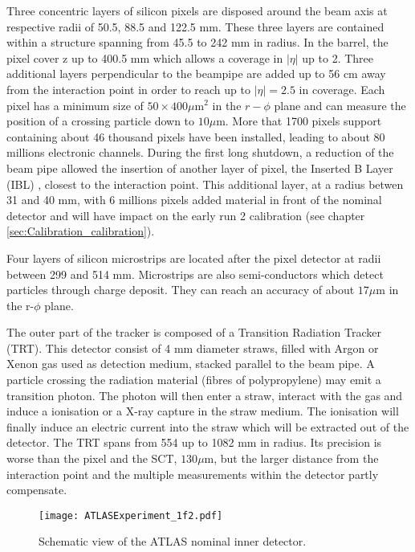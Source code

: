 Three concentric layers of silicon pixels are disposed around the beam axis at respective radii of 50.5, 88.5 and 122.5 mm.
These three layers are contained within a structure spanning from 45.5 to 242 mm in radius.
In the barrel, the pixel cover z up to 400.5 mm which allows a coverage in $|\eta|$ up to 2.
Three additional layers perpendicular to the beampipe are added up to 56 cm away from the interaction point in order to reach up to $|\eta|=2.5$ in coverage.
Each pixel has a minimum size of $50\times400 \mu$m$^2$ in the $r-\phi$ plane and can measure the position of a crossing particle down to $10\mu$m.
More that 1700 pixels support containing about 46 thousand pixels have been installed, leading to about 80 millions electronic channels.
During the first long shutdown, a reduction of the beam pipe allowed the insertion of another layer of pixel, the Inserted B Layer (IBL) \cite{CERN-LHCC-2010-013,CERN-LHCC-2012-009}, closest to the interaction point.
This additional layer, at a radius betwen 31 and 40 mm, with 6 millions pixels added material in front of the nominal detector and will have impact on the early run 2 calibration (see chapter \ref{sec:Calibration_calibration}).

Four layers of silicon microstrips are located after the pixel detector at radii between 299 and 514 mm.
Microstrips are also semi-conductors which detect particles through charge deposit.
They can reach an accuracy of about $17\mu$m in the r-$\phi$ plane.

The outer part of the tracker is composed of a Transition Radiation Tracker (TRT).
This detector consist of 4 mm diameter straws, filled with Argon or Xenon gas used as detection medium, stacked parallel to the beam pipe.
A particle crossing the radiation material (fibres of  polypropylene) may emit a transition photon.
The photon will then enter a straw, interact with the gas and induce a ionisation or a X-ray capture in the straw medium.
The ionisation will finally induce an electric current into the straw which will be extracted out of the detector.
The TRT spans from 554 up to 1082 mm in radius.
Its precision is worse than the pixel and the SCT, $130\mu$m, but the larger distance from the interaction point and the multiple measurements within the detector partly compensate.

\begin{figure}[htbp]
\centering
\texttt{[image: ATLASExperiment\_1f2.pdf]}
\caption{\label{fig:org92c81cc}
Schematic view of the ATLAS nominal inner detector.\cite{ATLASExperiment}}
\end{figure}

